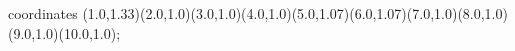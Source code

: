 					coordinates { (1.0,1.33)(2.0,1.0)(3.0,1.0)(4.0,1.0)(5.0,1.07)(6.0,1.07)(7.0,1.0)(8.0,1.0)(9.0,1.0)(10.0,1.0)};